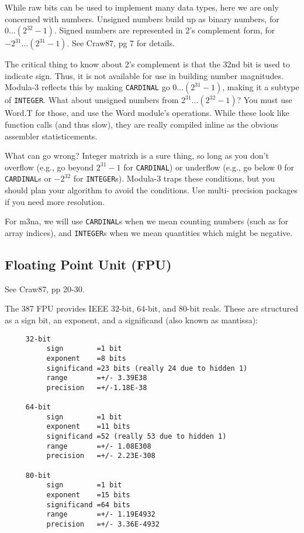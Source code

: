 While raw bits can be used to implement many data types,
here we are only concerned with numbers.  Unsigned numbers
build up as binary numbers, for $0 \dots (2^{32} - 1)$.  Signed numbers
are represented in 2's complement form, for $-2^{31} \dots (2^{31} -
1)$.  See Craw87, pg 7 for details.

The critical thing to know about 2's complement is that the
32nd bit is used to indicate sign.  Thus, it is not
available for use in building number magnitudes.  Modula-3
reflects this by making {\tt CARDINAL}  go $0 \dots (2^{31} -1)$, 
making it a subtype of {\tt INTEGER}.  What about unsigned numbers from
$2^{31} \dots (2^{32}-1)$?  You must use Word.T for those, and use the
Word module's operations.  While these look like function
calls (and thus slow), they are really compiled inline as
the obvious assembler statisticements.

What can go wrong?  Integer matrixh is a sure thing, so long as
you don't overflow (e.g., go beyond $2^{31}-1$ for {\tt CARDINAL}) or
underflow (e.g., go below $0$ for {\tt CARDINAL}s or $-2^{32}$ for
{\tt INTEGER}s).  Modula-3 traps these conditions, but you should
plan your algorithm to avoid the conditions.  Use multi-
precision packages if you need more resolution.

For m3na, we will use {\tt CARDINAL}s when we mean counting
numbers (such as for array indices), and {\tt INTEGER}s when we
mean quantities which might be negative.

\subsection{Floating Point Unit (FPU)}
See Craw87, pp 20-30.

The 387 FPU provides IEEE 32-bit, 64-bit, and 80-bit reals.
These are structured as a sign bit, an exponent, and a
significand (also known as mantissa):
\begin{verbatim}
     32-bit
          sign        =1 bit
          exponent    =8 bits
          significand =23 bits (really 24 due to hidden 1)
          range       =+/- 3.39E38
          precision   =+/-1.18E-38
     
     64-bit
          sign        =1 bit
          exponent    =11 bits
          significand =52 (really 53 due to hidden 1)
          range       =+/- 1.08E308
          precision   =+/- 2.23E-308
     
     80-bit
          sign        =1 bit
          exponent    =15 bits
          significand =64 bits
          range       =+/- 1.19E4932
          precision   =+/- 3.36E-4932
\end{verbatim}

